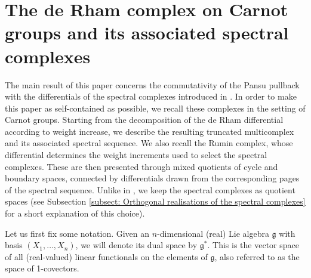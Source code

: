 \documentclass[dvipsnames]{amsart}
\theoremstyle{definition}
\theoremstyle{definition}
\numberwithin{equation}{section}
\begin{document}

\section{The de Rham complex on Carnot groups and its associated spectral complexes}\label{chapter truncated multicomplex}
The main result of this paper concerns the commutativity of the Pansu pullback with the differentials of the spectral complexes introduced in \cite{tripaldi2026spectralcomplexestruncatedmulticomplexes}. In order to make this paper as self-contained as possible, we recall these complexes in the setting of Carnot groups. Starting from the decomposition of the de Rham differential according to weight increase, we describe the resulting truncated multicomplex and its associated spectral sequence. We also recall the Rumin complex, whose differential determines the weight increments used to select the spectral complexes. These are then presented through mixed quotients of cycle and boundary spaces, connected by differentials drawn from the corresponding pages of the spectral sequence. Unlike in \cite{tripaldi2026spectralcomplexestruncatedmulticomplexes}, we keep the spectral complexes as quotient spaces (see Subsection \ref{subsect: Orthogonal realisations of the spectral complexes} for a short explanation of this choice).



Let us first fix some notation. Given an $n$-dimensional (real) Lie algebra $\mathfrak{g}$ with basis $(X_1,\ldots,X_n)$, we will denote its dual space by $\mathfrak{g}^\ast$. This is the vector space of all (real-valued) linear functionals on the elements of $\mathfrak{g}$, also referred to as the space of 1-covectors.
\end{document}
